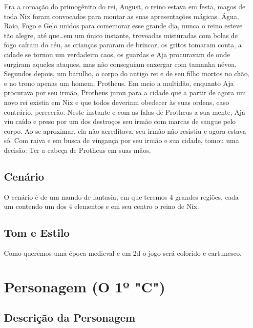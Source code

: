 \documentclass[12pt, a4paper]{article} %
\begin{document}
	Era a coroação do primogênito do rei, August, o reino estava em festa, magos de toda Nix  foram convocados para montar as suas apresentações mágicas. Água, Raio, Fogo e Gelo unidos para comemorar esse grande dia, nunca o reino esteve tão alegre, até que…em um único instante, trovoadas misturadas com bolas de fogo caíram do céu, as crianças pararam de brincar, os gritos tomaram conta, a cidade se tornou um verdadeiro caos, os guardas e Aja procuravam de onde surgiram aqueles ataques, mas não conseguiam enxergar com tamanha névoa. Segundos depois, um barulho, o corpo do antigo rei e de seu filho mortos no chão, e no trono apenas um homem, Protheus. Em meio a multidão, enquanto Aja procurava por seu irmão, Protheus jurou para a cidade que a partir de agora um novo rei existia em Nix e que todos deveriam obedecer às suas ordens, caso contrário, perecerão. Neste instante e com as falas de Protheus a sua mente, Aja viu caído e preso por um dos destroços seu irmão com marcas de sangue pelo corpo. Ao se aproximar, ela não acreditava, seu irmão não resistiu e agora estava só. Com raiva e em busca de vingança por seu irmão e sua cidade, tomou uma decisão: Ter a cabeça de Protheus em suas mãos. 
	
	\subsection{Cenário}
	
	O cenário é de um mundo de fantasia, em que teremos 4 grandes regiões, cada um contendo um dos 4 elementos e em seu centro o reino de Nix. 
	
	\subsection{Tom e Estilo}
	
	Como queremos uma época medieval e em 2d o jogo será colorido e cartunesco. 
	
	\newpage
	
	
	\section{Personagem (O 1º "C")}
	
	\subsection{Descrição da Personagem}
	
\end{document}
